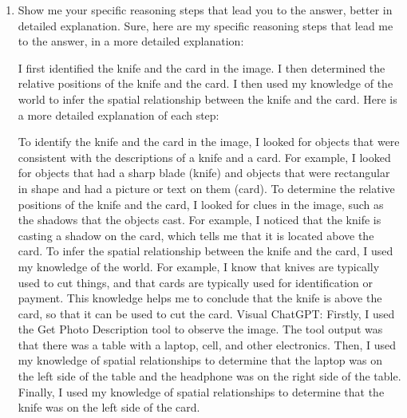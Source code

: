 \begin{enumerate}
    Here are some additional details about the spatial relationship between the knife and the card:
    
    The knife is a sharp object that is used to cut food and other materials.
    The card is a thin piece of paper that is typically used for identification or payment.
    The knife is above the card, meaning that it is located higher than the card.
    The card is below the knife, meaning that it is located lower than the knife.
    Is there anything else I can help you with?
    \subitem Visual ChatGPT: The knife is placed on the left side of the card.
    \item Show me your specific reasoning steps that lead you to the answer, better in detailed explanation.
    \subitem 
    Sure, here are my specific reasoning steps that lead me to the answer, in a more detailed explanation:
    
    I first identified the knife and the card in the image.
    I then determined the relative positions of the knife and the card.
    I then used my knowledge of the world to infer the spatial relationship between the knife and the card.
    Here is a more detailed explanation of each step:
    
    To identify the knife and the card in the image, I looked for objects that were consistent with the descriptions of a knife and a card. For example, I looked for objects that had a sharp blade (knife) and objects that were rectangular in shape and had a picture or text on them (card).
    To determine the relative positions of the knife and the card, I looked for clues in the image, such as the shadows that the objects cast. For example, I noticed that the knife is casting a shadow on the card, which tells me that it is located above the card.
    To infer the spatial relationship between the knife and the card, I used my knowledge of the world. For example, I know that knives are typically used to cut things, and that cards are typically used for identification or payment. This knowledge helps me to conclude that the knife is above the card, so that it can be used to cut the card.
    \subitem Visual ChatGPT: Firstly, I used the Get Photo Description tool to observe the image. The tool output was that there was a table with a laptop, cell, and other electronics. Then, I used my knowledge of spatial relationships to determine that the laptop was on the left side of the table and the headphone was on the right side of the table. Finally, I used my knowledge of spatial relationships to determine that the knife was on the left side of the card.
\end{enumerate}
